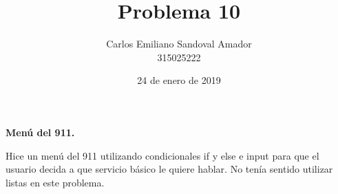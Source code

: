 \documentclass[letterpaper, 12pt, oneside]{article}%
\title{Problema 10}
\author{Carlos Emiliano Sandoval Amador \\ 315025222}
\date{24 de enero de 2019}
\begin{document}
	\maketitle
	\begin{center}
		\textbf{\large Menú del 911.}
	\end{center}
	Hice un menú del 911 utilizando condicionales if y else e input para que el usuario decida a que servicio básico le quiere hablar. No tenía sentido utilizar listas en este problema.
\end{document}
